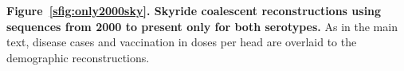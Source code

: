 \documentclass[a4paper,10pt]{article}
\begin{document}
\textbf{Figure~\ref{sfig:only2000sky}. Skyride coalescent reconstructions using sequences from 2000 to present only for both serotypes.}
As in the main text, disease cases and vaccination in doses per head are overlaid to the demographic reconstructions.
\newpage
\begin{center}
\begin{figure}[H]
\begin{center}
\\
\\

\end{center}
\end{figure}
\end{center}
\end{document}
